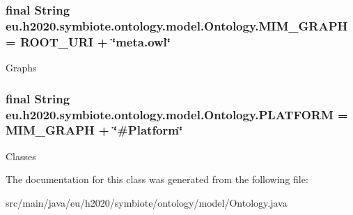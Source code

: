 \subsubsection[{\texorpdfstring{M\+I\+M\+\_\+\+G\+R\+A\+PH}{MIM_GRAPH}}]{\setlength{\rightskip}{0pt plus 5cm}final String eu.\+h2020.\+symbiote.\+ontology.\+model.\+Ontology.\+M\+I\+M\+\_\+\+G\+R\+A\+PH = R\+O\+O\+T\+\_\+\+U\+RI + \char`\"{}meta.\+owl\char`\"{}\hspace{0.3cm}{\ttfamily [static]}}\hypertarget{classeu_1_1h2020_1_1symbiote_1_1ontology_1_1model_1_1Ontology_abd334d1878740c80789fc2c6a9bf8afe}{}\label{classeu_1_1h2020_1_1symbiote_1_1ontology_1_1model_1_1Ontology_abd334d1878740c80789fc2c6a9bf8afe}
Graphs 
\subsubsection[{\texorpdfstring{P\+L\+A\+T\+F\+O\+RM}{PLATFORM}}]{\setlength{\rightskip}{0pt plus 5cm}final String eu.\+h2020.\+symbiote.\+ontology.\+model.\+Ontology.\+P\+L\+A\+T\+F\+O\+RM = {\bf M\+I\+M\+\_\+\+G\+R\+A\+PH} + \char`\"{}\#Platform\char`\"{}\hspace{0.3cm}{\ttfamily [static]}}\hypertarget{classeu_1_1h2020_1_1symbiote_1_1ontology_1_1model_1_1Ontology_ac00eec92634db1932e091e2e6745805f}{}\label{classeu_1_1h2020_1_1symbiote_1_1ontology_1_1model_1_1Ontology_ac00eec92634db1932e091e2e6745805f}
Classes 

The documentation for this class was generated from the following file\+:\begin{DoxyCompactItemize}
\item 
src/main/java/eu/h2020/symbiote/ontology/model/Ontology.\+java\end{DoxyCompactItemize}
